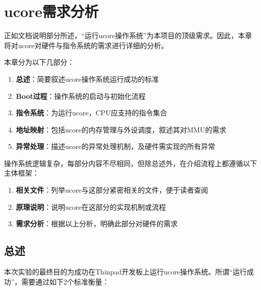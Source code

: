 \chapter{ucore需求分析}

正如文档说明部分所述，``运行ucore操作系统''为本项目的顶级需求。因此，本章将对ucore对硬件与指令系统的需求进行详细的分析。

本章分为以下几部分：
\begin{enumerate}
    \item {\bf 总述}：简要叙述ucore操作系统运行成功的标准
    \item {\bf Boot过程}：操作系统的启动与初始化流程
    \item {\bf 指令系统}：为运行ucore，CPU应支持的指令集合
    \item {\bf 地址映射}：包括ucore的内存管理与外设调度，叙述其对MMU的需求
    \item {\bf 异常处理}：描述ucore的异常处理机制，及硬件需实现的所有异常
\end{enumerate}

操作系统逻辑复杂，每部分内容不尽相同，但除总述外，在介绍流程上都遵循以下主体框架：

\begin{enumerate}
    \item {\bf 相关文件}：列举ucore与这部分紧密相关的文件，便于读者查阅
    \item {\bf 原理说明}：说明ucore在这部分的实现机制或流程
    \item {\bf 需求分析}：根据以上分析，明确此部分对硬件的需求
\end{enumerate}

\section{总述}

本次实验的最终目的为成功在Thinpad开发板上运行ucore操作系统。所谓``运行成功''，需要通过如下2个标准衡量：

